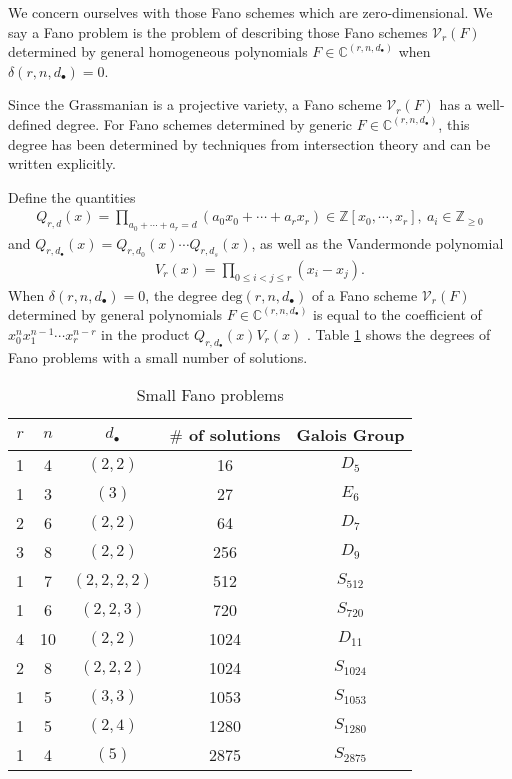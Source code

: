 \documentclass[12pt]{amsart}
\theoremstyle{definition}
\newcommand{\defcolor}[1]{{\color{RoyalBlue}#1}}
\begin{document}
We concern ourselves with those Fano schemes which are zero-dimensional. We say a \defcolor{Fano problem} is the problem of describing those Fano schemes $\mathcal{V}_r(F)$ determined by general homogeneous polynomials $F\in \mathbb{C}^{(r,n,d_\bullet)}$ when $\delta(r,n,d_\bullet) = 0$.

Since the Grassmanian is a projective variety, a Fano scheme $\mathcal{V}_r(F)$ has a well-defined degree. For Fano schemes determined by generic $F\in\mathbb{C}^{(r,n,d_\bullet)}$, this degree has been determined by techniques from intersection theory and can be written explicitly. 

Define the quantities
\begin{align*}
Q_{r,d}(x) = \prod_{a_0+\dotsb+a_r=d}(a_0x_0 + \dotsb + a_rx_r)\in\mathbb{Z}[x_0,\dotsb,x_r],~a_i\in\mathbb{Z}_{\ge 0}
\end{align*}
and $Q_{r,d_\bullet}(x) = Q_{r,d_0}(x)\dotsb Q_{r,d_s}(x)$, as well as the Vandermonde polynomial
\begin{align*}
V_r(x) = \prod_{0\le i<j\le r}(x_i-x_j).
\end{align*}
When $\delta(r,n,d_\bullet) = 0$, the degree $\text{deg}(r,n,d_\bullet)$ of a Fano scheme $\mathcal{V}_r(F)$ determined by general polynomials $F\in \mathbb{C}^{(r,n,d_\bullet)}$ is equal to the coefficient of $x_0^n x_1^{n-1}\dotsb x_r^{n-r}$ in the product $Q_{r,d_\bullet}(x)V_r(x)$ \cite{DM}. Table \ref{Small Fano} shows the degrees of Fano problems with a small number of solutions.
\begin{table}[htb]
  \caption{Small Fano problems}
  \label{Small Fano}
  \def\arraystretch{1.2}
  \begin{tabular}{||c|c|c|c|c||}
    \hline
    $r$ & $n$ & $d_\bullet$ & $\#$ of solutions & Galois Group\\
    \hline\hline
    1 & 4 & $(2,2)$ & 16 & $D_5$\\
    \hline
    1 & 3 & $(3)$ & 27 & $E_6$\\
    \hline
    2 & 6 & $(2,2)$ & 64 & $D_7$\\
    \hline
    3 & 8 & $(2,2)$ & 256 & $D_9$\\
    \hline
    1 & 7 & $(2,2,2,2)$ & 512 & $S_{512}$\\
    \hline
    1 & 6 & $(2,2,3)$ & 720  & $S_{720}$\\
    \hline
    4 & 10 & $(2,2)$ & 1024 & $D_{11}$\\
    \hline
    2 & 8 & $(2,2,2)$ & 1024  & $S_{1024}$\\
    \hline
    1 & 5 & $(3,3)$ & 1053  & $S_{1053}$\\
    \hline
    1 & 5 & $(2,4)$ & 1280  & $S_{1280}$\\
    \hline
    1 & 4 & $(5)$ & 2875 & $S_{2875}$\\
    \hline
  \end{tabular}
\end{table}
\end{document}
